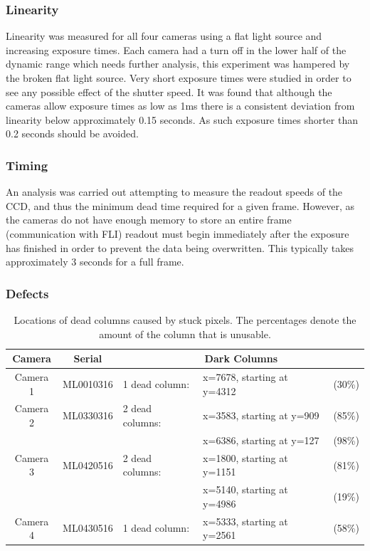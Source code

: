 \begin{colsection}
\begin{colsection}
\newpage
\subsubsection{Linearity}

Linearity was measured for all four cameras using a flat light source and increasing exposure times. Each camera had a turn off in the lower half of the dynamic range which needs further analysis, this experiment was hampered by the broken flat light source. Very short exposure times were studied in order to see any possible effect of the shutter speed. It was found that although the cameras allow exposure times as low as 1ms there is a consistent deviation from linearity below approximately 0.15 seconds. As such exposure times shorter than 0.2 seconds should be avoided.

\newpage
\subsubsection{Timing}

An analysis was carried out attempting to measure the readout speeds of the CCD, and thus the minimum dead time required for a given frame. However, as the cameras do not have enough memory to store an entire frame (communication with FLI) readout must begin immediately after the exposure has finished in order to prevent the data being overwritten. This typically takes approximately 3 seconds for a full frame.

\newpage
\subsubsection{Defects}

\begin{table}[t]
    \begin{center}
        \begin{tabular}{cc|lll} %
            Camera   & Serial    & \multicolumn{3}{c}{Dark Columns} \\
            \midrule
            Camera 1 & ML0010316 & 1 dead column:  & x=7678, starting at y=4312 & (30\%) \\
            Camera 2 & ML0330316 & 2 dead columns: & x=3583, starting at y=909  & (85\%) \\
                     &           &                 & x=6386, starting at y=127  & (98\%) \\
            Camera 3 & ML0420516 & 2 dead columns: & x=1800, starting at y=1151 & (81\%) \\
                     &           &                 & x=5140, starting at y=4986 & (19\%) \\
            Camera 4 & ML0430516 & 1 dead column:  & x=5333, starting at y=2561 & (58\%) \\
        \end{tabular}
    \end{center}
    \caption[TODO]{
        Locations of dead columns caused by stuck pixels. The percentages denote the amount of the column that is unusable.
    }\label{tab:frame}
\end{table}


\end{colsection}
\end{colsection}
